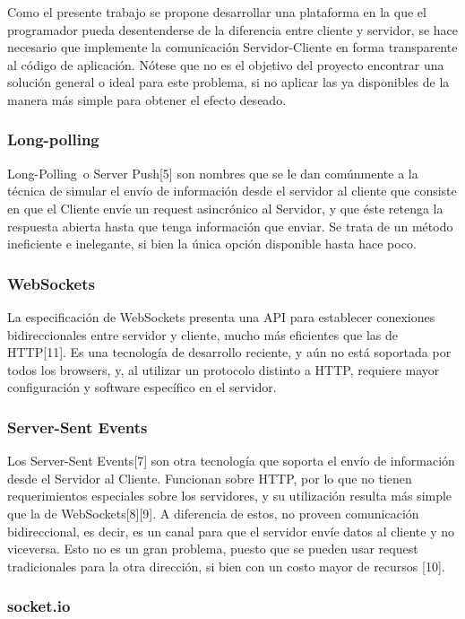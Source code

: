 \documentclass[doc,helv,longtable]{article}
\begin{document}
Como el presente trabajo se propone desarrollar una plataforma en la que el programador pueda desentenderse de la diferencia entre cliente y servidor, se hace necesario que implemente la comunicación Servidor-Cliente en forma transparente al código de aplicación. Nótese que no es el objetivo del proyecto encontrar una solución general o ideal para este problema, si no aplicar las ya disponibles de la manera más simple para obtener el efecto deseado.\subsubsection{Long-polling}


Long-Polling o Server Push[5] son nombres que se le dan comúnmente a la técnica de simular el envío de información desde el servidor al cliente que consiste en que el Cliente envíe un request asincrónico al Servidor, y que éste retenga la respuesta abierta hasta que tenga información que enviar. Se trata de un método ineficiente e inelegante, si bien la única opción disponible hasta hace poco.\subsubsection{WebSockets}


La especificación de WebSockets presenta una API para establecer conexiones bidireccionales entre servidor y cliente, mucho más eficientes que las de HTTP[11]. Es una tecnología de desarrollo reciente, y aún no está soportada por todos los browsers, y, al utilizar un protocolo distinto a HTTP, requiere mayor configuración y software específico en el servidor. \subsubsection{Server-Sent Events}


Los Server-Sent Events[7] son otra tecnología que soporta el envío de información desde el Servidor al Cliente. Funcionan sobre HTTP, por lo que no tienen requerimientos especiales sobre los servidores, y su utilización resulta más simple que la de WebSockets[8][9]. A diferencia de estos, no proveen comunicación bidireccional, es decir, es un canal para que el servidor envíe datos al cliente y no viceversa. Esto no es un gran problema, puesto que se pueden usar request tradicionales para la otra dirección, si bien con un costo mayor de recursos [10].\subsubsection{socket.io}
\end{document}

